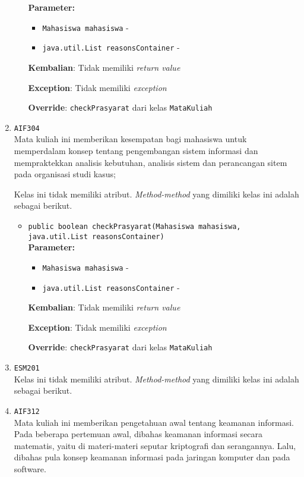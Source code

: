 \documentclass{article}
\begin{document}
\begin{enumerate}
\begin{itemize}
\textbf{Parameter:}\begin{itemize}
\item \texttt{Mahasiswa mahasiswa} - 
\item \texttt{java.util.List reasonsContainer} - 
\end{itemize}
\textbf{Kembalian}: Tidak memiliki \textit{return value}

\textbf{Exception}: Tidak memiliki \textit{exception}

\textbf{Override}: \texttt{checkPrasyarat} dari kelas \texttt{MataKuliah}

\end{itemize}
\item \texttt{AIF304}\\ 
Mata kuliah ini memberikan kesempatan bagi mahasiswa untuk memperdalam konsep
 tentang pengembangan sistem informasi dan mempraktekkan analisis kebutuhan,
 analisis sistem dan perancangan sitem pada organisasi studi kasus;

Kelas ini tidak memiliki atribut. \textit{Method-method} yang dimiliki kelas ini adalah sebagai berikut.
\begin{itemize}
\item \texttt{public boolean checkPrasyarat(Mahasiswa mahasiswa, java.util.List reasonsContainer)}\\ 


\textbf{Parameter:}\begin{itemize}
\item \texttt{Mahasiswa mahasiswa} - 
\item \texttt{java.util.List reasonsContainer} - 
\end{itemize}
\textbf{Kembalian}: Tidak memiliki \textit{return value}

\textbf{Exception}: Tidak memiliki \textit{exception}

\textbf{Override}: \texttt{checkPrasyarat} dari kelas \texttt{MataKuliah}

\end{itemize}
\item \texttt{ESM201}\\ 
Kelas ini tidak memiliki atribut. \textit{Method-method} yang dimiliki kelas ini adalah sebagai berikut.
\begin{itemize}
\end{itemize}
\item \texttt{AIF312}\\ 
Mata kuliah ini memberikan pengetahuan awal tentang keamanan informasi. Pada
 beberapa pertemuan awal, dibahas keamanan informasi secara matematis, yaitu
 di materi-materi seputar kriptografi dan serangannya. Lalu, dibahas pula
 konsep keamanan informasi pada jaringan komputer dan pada software.


\end{enumerate}
\end{document}
